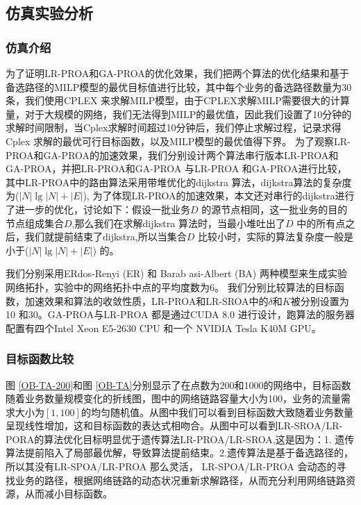 \subsection{仿真实验分析}
\subsubsection {仿真介绍}

为了证明LR-PROA和GA-PROA的优化效果，我们把两个算法的优化结果和基于备选路径的MILP模型的最优目标值进行比较，其中每个业务的备选路径数量为30条，我们使用CPLEX 来求解MILP模型，由于CPLEX求解MILP需要很大的计算量，对于大规模的网络，我们无法得到MILP的最优值，因此我们设置了10分钟的求解时间限制，当Cplex求解时间超过10分钟后，我们停止求解过程，记录求得Cplex 求解的最优可行目标函数，以及MILP模型的最优值得下界。
为了观察LR-PROA和GA-PROA的加速效果，我们分别设计两个算法串行版本LR-PROA和GA-PROA，并把LR-PROA和GA-PROA 与LR-PROA 和GA-PROA进行比较，其中LR-PROA中的路由算法采用带堆优化的dijkstra 算法，dijkstra算法的复杂度为($|N|\lg |N| +|E|$), 为了体现LR-PROA的加速效果，本文还对串行的dijkstra进行了进一步的优化，讨论如下：假设一批业务$D$ 的源节点相同，这一批业务的目的节点组成集合$D$,那么我们在求解dijkstra 算法时，当最小堆吐出了$D$ 中的所有点之后，我们就提前结束了dijkstra,所以当集合$D$ 比较小时，实际的算法复杂度一般是小于($|N|\lg |N| +|E|$) 的。

我们分别采用ERdos-Renyi (ER) 和 Barab asi-Albert (BA) 两种模型来生成实验网络拓扑，实验中的网络拓扑中点的平均度数为6。 我们分别比较算法的目标函数，加速效果和算法的收敛性质，LR-PROA和LR-SROA中的$\delta$和$K$被分别设置为10 和30。GA-PROA与LR-PROA 都是通过CUDA 8.0 进行设计，跑算法的服务器配置有四个Intel Xeon E5-2630 CPU 和一个 NVIDIA Tesla K40M GPU。
\subsubsection{目标函数比较}
图 \ref{OB-TA-200}和图 \ref{OB-TA}分别显示了在点数为200和1000的网络中，目标函数随着业务数量规模变化的折线图，图中的网络链路容量大小为100，业务的流量需求大小为$[1,100]$的均匀随机值。从图中我们可以看到目标函数大致随着业务数量呈现线性增加，这和目标函数的表达式相吻合。从图中可以看到LR-SROA/LR-PORA的算法优化目标明显优于遗传算法LR-PROA/LR-SROA,这是因为：1. 遗传算法提前陷入了局部最优解，导致算法提前结束。2.遗传算法是基于备选路径的，所以其没有LR-SPOA/LR-PROA 那么灵活， LR-SPOA/LR-PROA 会动态的寻找业务的路径，根据网络链路的动态状况重新求解路径，从而充分利用网络链路资源，从而减小目标函数。

